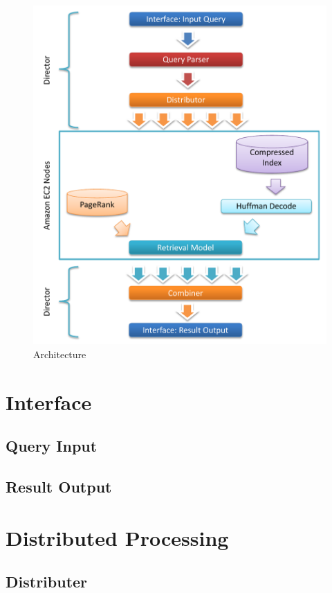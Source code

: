 \documentclass[letterpaper,11pt,twoside]{article}
\begin{document}
\begin{figure}[htb]
 \centering
 \includegraphics[trim=0.0in 0.00in 0.0in 0.0in, clip, page=1]{Architecture.pdf}
 \caption{Architecture}
 \label{fig:Architecture}
\end{figure}

\section{Interface}

\subsection{Query Input}

\subsection{Result Output}

\section{Distributed Processing}

\subsection{Distributer}
\end{document}
